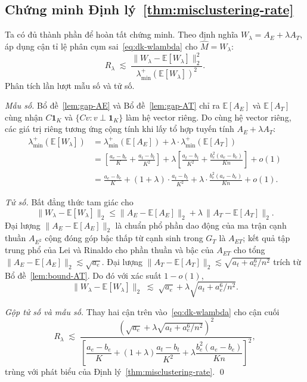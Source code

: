 \subsection{Chứng minh Định lý~\ref{thm:misclustering-rate}}
\label{subsec:proof-misclustering}

Ta có đủ thành phần để hoàn tất chứng minh. Theo định nghĩa $W_\lambda = A_E + \lambda A_T$, áp dụng cận tỉ lệ phân cụm sai~\eqref{eq:dk-wlambda} cho $\widehat M = W_\lambda$:
\[
    R_\lambda \;\lesssim\; \frac{\|W_\lambda - \mathbb{E}[W_\lambda]\|_2^2}{\lambda_{\min}^+(\mathbb{E}[W_\lambda])^2}.
\]
\clearpage
Phân tích lần lượt mẫu số và tử số.

\emph{Mẫu số.} Bổ đề~\ref{lem:gap-AE} và Bổ đề~\ref{lem:gap-AT} chỉ ra $\mathbb{E}[A_E]$ và $\mathbb{E}[A_T]$ cùng nhận $C \mathbf{1}_K$ và $\{C v : v \perp \mathbf{1}_K\}$ làm hệ vector riêng. Do cùng hệ vector riêng, các giá trị riêng tương ứng cộng tính khi lấy tổ hợp tuyến tính $A_E + \lambda A_T$:
\begin{align*}
    \lambda_{\min}^+(\mathbb{E}[W_\lambda])
        &= \lambda_{\min}^+(\mathbb{E}[A_E]) + \lambda \cdot \lambda_{\min}^+(\mathbb{E}[A_T]) \\
        &= \left[\frac{a_e - b_e}{K} + \frac{a_t - b_t}{K^2}\right] + \lambda \left[\frac{a_t - b_t}{K^2} + \frac{b_e^2 (a_e - b_e)}{K n}\right] + o(1) \\
        &= \frac{a_e - b_e}{K} + (1 + \lambda) \cdot \frac{a_t - b_t}{K^2} + \lambda \cdot \frac{b_e^2 (a_e - b_e)}{K n} + o(1).
\end{align*}

\emph{Tử số.} Bất đẳng thức tam giác cho
\[
    \|W_\lambda - \mathbb{E}[W_\lambda]\|_2 \leq \|A_E - \mathbb{E}[A_E]\|_2 + \lambda \, \|A_T - \mathbb{E}[A_T]\|_2.
\]
Đại lượng $\|A_E - \mathbb{E}[A_E]\|_2$ là chuẩn phổ phần dao động của ma trận cạnh thuần $A_{E^2}$ cộng đóng góp bậc thấp từ cạnh sinh trong $G_T$ là $A_{ET}$; kết quả tập trung phổ của Lei và Rinaldo \cite{lei2015} cho phần thuần và bậc của $A_{ET}$ cho tổng $\|A_E - \mathbb{E}[A_E]\|_2 \lesssim \sqrt{a_e}$. Đại lượng $\|A_T - \mathbb{E}[A_T]\|_2 \lesssim \sqrt{a_t + a_e^6/n^2}$ trích từ Bổ đề~\ref{lem:bound-AT}. Do đó với xác suất $1 - o(1)$,
\[
    \|W_\lambda - \mathbb{E}[W_\lambda]\|_2 \;\lesssim\; \sqrt{a_e} + \lambda \sqrt{a_t + a_e^6/n^2}.
\]

\emph{Gộp tử số và mẫu số.} Thay hai cận trên vào~\eqref{eq:dk-wlambda} cho cận cuối
\[
    R_\lambda \;\lesssim\; \frac{\left(\sqrt{a_e} + \lambda \sqrt{a_t + a_e^6/n^2}\right)^2}{\left[\dfrac{a_e - b_e}{K} + (1 + \lambda) \dfrac{a_t - b_t}{K^2} + \lambda \dfrac{b_e^2 (a_e - b_e)}{K n}\right]^2},
\]
trùng với phát biểu của Định lý~\ref{thm:misclustering-rate}. \qed

